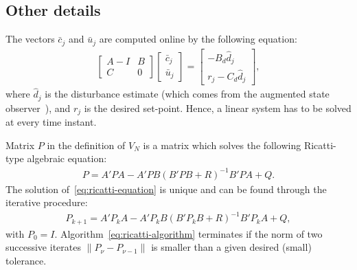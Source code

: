 \documentclass[12pt]{report}
\newcommand{\bcj}{\bar{c}_j}
\newcommand{\buj}{\bar{u}_j}
\begin{document}
\subsection*{Other details}
The vectors $\bcj$ and $\buj$ are computed online by
the following equation:
\begin{align}
\left[\begin{array}{cc}
A-I & B\\ C & 0
\end{array}\right]
\left[\begin{array}{c}
\bcj\\ 
\buj
\end{array}\right]=\left[\begin{array}{c}
-B_d \hat{d}_j\\
r_j - C_d \hat{d}_j
\end{array}\right],
\end{align}
where $\hat{d}_j$ is the disturbance estimate (which comes from
the augmented state observer~\cite[Eq. (24)]{SopPatSar14}),
and $r_j$ is the desired set-point. Hence, a linear system
has to be solved at every time instant.

Matrix $P$ in the definition of $V_N$ is a matrix which solves
the following Ricatti-type algebraic equation:
\begin{align}\label{eq:ricatti-equation}
P=A'PA - A'PB(B'PB+R)^{-1}B'PA+Q.
\end{align}
The solution of~\eqref{eq:ricatti-equation} is unique and can be 
found through the iterative procedure:
\begin{align}\label{eq:ricatti-algorithm}
P_{k+1}=A'P_kA - A'P_kB(B'P_kB+R)^{-1}B'P_kA+Q,
\end{align}
with $P_0=I$. Algorithm~\eqref{eq:ricatti-algorithm} terminates if the
norm of two successive iterates $\|P_{\nu}-P_{\nu-1}\|$ is smaller than 
a given desired (small) tolerance. 


\end{document}
